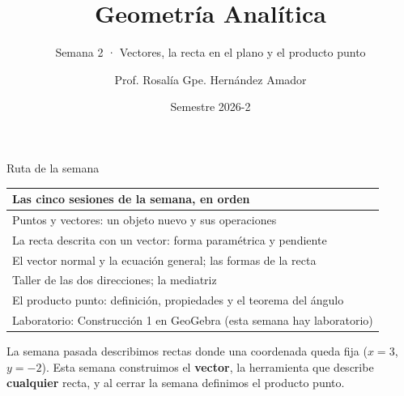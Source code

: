 \documentclass[aspectratio=169,10pt]{beamer}
\title{\LARGE\textbf{Geometría Analítica}}
\subtitle{Semana 2 · Vectores, la recta en el plano y el producto punto}
\author{Prof. Rosalía Gpe. Hernández Amador}
\institute{Departamento de Matemáticas · Universidad de Sonora}
\date{Semestre 2026-2}
\newcommand{\destaca}[1]{%
  \par\vspace{3pt}\noindent
  \colorbox{turquesaClaro}{%
    \parbox{\dimexpr\linewidth-2\fboxsep\relax}{\vspace{3pt}#1\vspace{3pt}}}%
  \par\vspace{3pt}}
\begin{document}
\begin{frame}[plain]
  \titlepage
\end{frame}
\begin{frame}{Ruta de la semana}
  \centering
  {\small
  \begin{tabular}{@{}l@{}}
    \toprule
    \textbf{Las cinco sesiones de la semana, en orden} \\
    \midrule
    Puntos y vectores: un objeto nuevo y sus operaciones \\
    La recta descrita con un vector: forma paramétrica y pendiente \\
    El vector normal y la ecuación general; las formas de la recta \\
    Taller de las dos direcciones; la mediatriz \\
    El producto punto: definición, propiedades y el teorema del ángulo \\
    \midrule
    Laboratorio: Construcción 1 en GeoGebra (esta semana hay laboratorio) \\
    \bottomrule
  \end{tabular}}

  \vspace{0.4cm}
  \raggedright
  \destaca{La semana pasada describimos rectas donde una coordenada queda
  fija ($x=3$, $y=-2$). Esta semana construimos el \textbf{vector}, la
  herramienta que describe \textbf{cualquier} recta, y al cerrar la
  semana definimos el producto punto.}
\end{frame}
\end{document}
